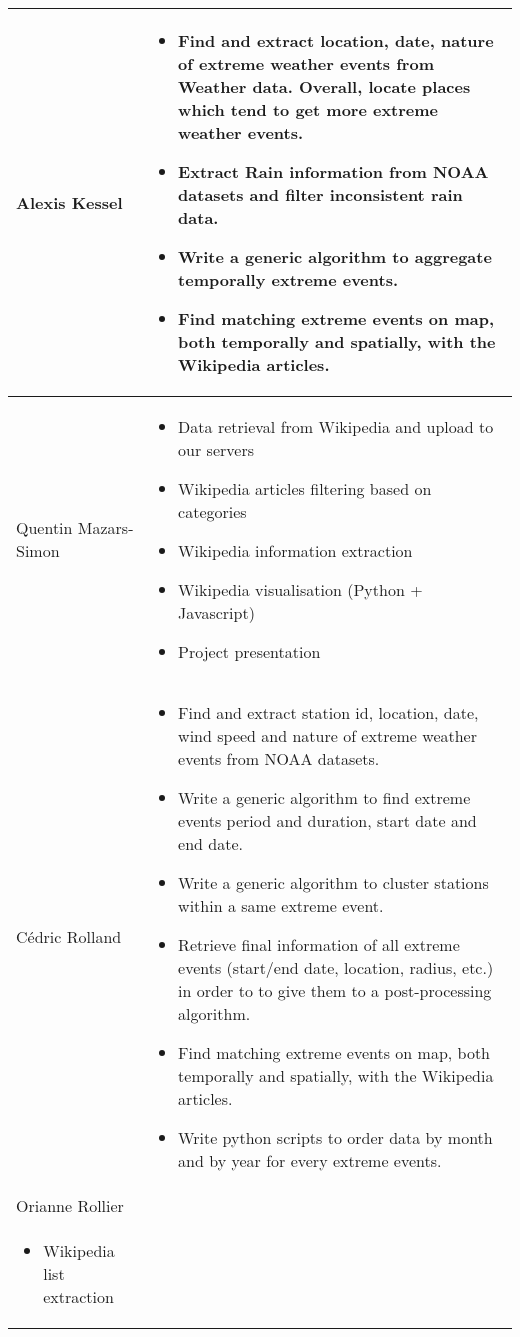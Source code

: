 \begin{longtable}{|l|p{10.5cm}|}
\hline
Alexis Kessel & \begin{itemize}
	\item Find and extract location, date, nature of extreme weather events from Weather data. Overall, locate places which tend to get more extreme weather events.
	\item Extract Rain information from NOAA datasets and filter inconsistent rain data.
	\item Write a generic algorithm to aggregate temporally extreme events.
	\item Find matching extreme events on map, both temporally and spatially, with the Wikipedia articles.
\end{itemize}\\
\hline
Quentin Mazars-Simon & \begin{itemize}
	\item Data retrieval from Wikipedia and upload to our servers
	\item Wikipedia articles filtering based on categories
	\item Wikipedia information extraction
	\item Wikipedia visualisation (Python + Javascript)
	\item Project presentation
\end{itemize}\\
\hline
Cédric Rolland &  \begin{itemize}
	\item Find and extract station id, location, date, wind speed and nature of extreme weather events from NOAA datasets.
	\item Write a generic algorithm to find extreme events period and duration, start date and end date.
	\item Write a generic algorithm to cluster stations within a same extreme event.
	\item Retrieve final information of all extreme events (start/end date, location, radius, etc.) in order to to give them to a post-processing algorithm.
	\item Find matching extreme events on map, both temporally and spatially, with the Wikipedia articles.
	\item Write python scripts to order data by month and by year for every extreme events.
\end{itemize}\\
\hline
Orianne Rollier & \\
\begin{itemize}
	\item Wikipedia list extraction

\end{itemize}
\end{longtable}
